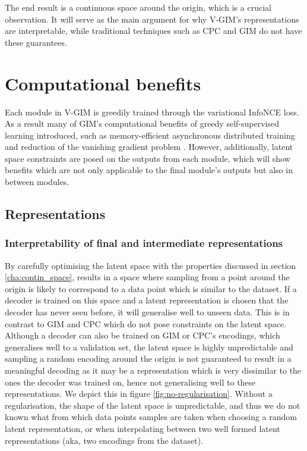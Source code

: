 			The end result is a continuous space around the origin, which is a crucial observation. It will serve as the main argument for why V-GIM's representations are interpretable, while traditional techniques such as CPC and GIM do not have these guarantees. 

			


		
	
	
	
\section{Computational benefits}
	Each module in V-GIM is greedily trained through the variational InfoNCE loss. As a result many of GIM's computational benefits of greedy self-supervised learning introduced, such as memory-efficient asynchronous distributed training and reduction of the vanishing gradient problem \cite{lowePuttingEndEndtoEnd2020}. However, additionally, latent space constraints are posed on the outputs from each module, which will show benefits which are not only applicable to the final module's outputs but also in between modules.
	

	
\subsection{Representations}
	\subsubsection{Interpretability of final and intermediate representations}
	
		By carefully optimising the latent space with the properties discussed in section \ref{cha:contin_space}, results in a space where sampling from a point around the origin is likely to correspond to a data point which is similar to the dataset. If a decoder is trained on this space and a latent representation is chosen that the decoder has never seen before, it will generalise well to unseen data. This is in contrast to GIM and CPC which do not pose constraints on the latent space. Although a decoder can also be trained on GIM or CPC's encodings, which generalises well to a validation set, the latent space is highly unpredictable and sampling a random encoding around the origin is not guaranteed to result in a meaningful decoding as it may be a representation which is very dissimilar to the ones the decoder was trained on, hence not generalising well to these representations. We depict this in figure \ref{fig:no-regularisation}. Without a regularisation, the shape of the latent space is unpredictable, and thus we do not known what from which data points samples are taken when choosing a random latent representation, or when interpolating between two well formed latent representations (aka, two encodings from the dataset).
	
